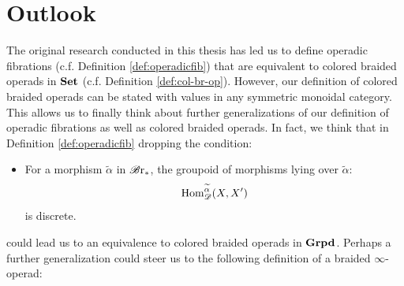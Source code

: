 \section{Outlook}


The original research conducted in this thesis has led us to define operadic
fibrations (c.f. Definition \ref{def:operadicfib}) that are equivalent to
colored braided operads in $\operatorname{\textbf{Set}}$ (c.f. Definition \ref{def:col-br-op}). However, our
definition of colored braided operads can be stated with values in any symmetric
monoidal category. This allows us to finally think about further generalizations
of our definition of operadic fibrations as well as colored braided operads. In
fact, we think that in Definition \ref{def:operadicfib} dropping the condition:
\begin{itemize}
    \item [(iii)] For a morphism $\widetilde{\alpha}$ in $\mathscr{B} \text{r}_{\ast}$, the groupoid of
    morphisms lying over $\widetilde{\alpha}$:
    $$\operatorname{Hom}_{\mathscr{D}}^{\widetilde{\alpha}}(X, X')$$ is discrete.
\end{itemize}
could lead us to an equivalence to colored braided operads in $\operatorname{\textbf{Grpd}}$. Perhaps a
further generalization could steer us to the following definition of a braided
$\infty$-operad:
